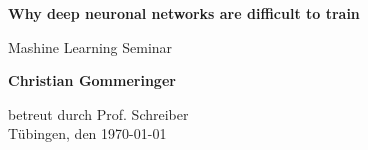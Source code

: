 \documentclass[12pt]{article}
\begin{document}
\begin{titlepage}
    \begin{center}
        \vspace*{1cm}
            
        \Huge
        \textbf{Why deep neuronal networks are difficult to train}
            
        
        \large
        
            
        \vspace{0.7cm}
            Mashine Learning Seminar
        \vspace{2cm}
        

        \textbf{Christian Gommeringer}
            
        \vspace*{7cm}
        
        
            
        
              
        
            
        
            
        \normalsize
        betreut durch Prof. Schreiber\\
        \vspace*{1cm}
        Tübingen, den \today
        
            
    \end{center}
\end{titlepage}
\end{document}
